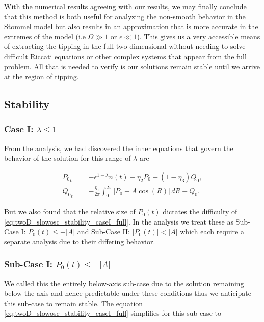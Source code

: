 With the numerical results agreeing with our results, we may finally conclude that this method is both useful for analyzing the non-smooth behavior in the Stommel model but also results in an approximation that is more accurate in the extremes of the model (i.e $\Omega \gg 1$ or $\epsilon \ll 1$). This gives us a very accessible means of extracting the tipping in the full two-dimensional without needing to solve difficult Riccati equations or other complex systems that appear from the full problem. All that is needed to verify is our solutions remain stable until we arrive at the region of tipping.

\subsection{Stability}

\subsubsection{Case I: $\lambda\le 1$}

From the analysis, we had discovered the inner equations that govern the behavior of the solution for this range of $\lambda$ are

\begin{equation}\label{eq:twoD_slowosc_stability_caseI_full}
\begin{aligned}
{P_0}_t =& -\epsilon^{1-\lambda} n(t)-\eta_2 P_0 -(1-\eta_3)Q_0,\\
{Q_0}_t =& -\frac{\eta_1}{2\pi}\int_0^{2\pi}|P_0-A\cos(R)|\,dR - Q_0.
\end{aligned}
\end{equation}

But we also found that the relative size of $P_0(t)$ dictates the difficulty of \eqref{eq:twoD_slowosc_stability_caseI_full}. In the analysis we treat these as Sub-Case I: $P_0(t)\le-|A|$ and Sub-Case II: $|P_0(t)|<|A|$ which each require a separate analysis due to their differing behavior.

\subsubsection{Sub-Case I: $P_0(t)\le-|A|$}

We called this the entirely below-axis sub-case due to the solution remaining below the axis and hence predictable under these conditions thus we anticipate this sub-case to remain stable. The equation \eqref{eq:twoD_slowosc_stability_caseI_full} simplifies for this sub-case to

